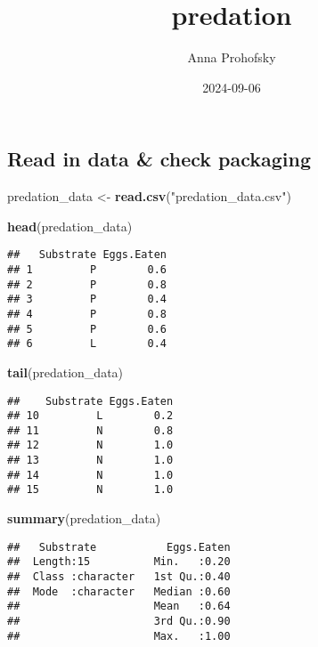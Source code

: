 \documentclass[
]{article}
\title{predation}
\author{Anna Prohofsky}
\date{2024-09-06}
\newenvironment{Shaded}{\begin{snugshade}}{\end{snugshade}}
\newcommand{\FunctionTok}[1]{\textcolor[rgb]{0.13,0.29,0.53}{\textbf{#1}}}
\newcommand{\NormalTok}[1]{#1}
\newcommand{\OtherTok}[1]{\textcolor[rgb]{0.56,0.35,0.01}{#1}}
\newcommand{\StringTok}[1]{\textcolor[rgb]{0.31,0.60,0.02}{#1}}
\begin{document}
\maketitle

\subsection{Read in data \& check
packaging}\label{read-in-data-check-packaging}

\begin{Shaded}
\begin{Highlighting}[]
\NormalTok{predation\_data }\OtherTok{\textless{}{-}} \FunctionTok{read.csv}\NormalTok{(}\StringTok{"predation\_data.csv"}\NormalTok{) }

\FunctionTok{head}\NormalTok{(predation\_data)}
\end{Highlighting}
\end{Shaded}

\begin{verbatim}
##   Substrate Eggs.Eaten
## 1         P        0.6
## 2         P        0.8
## 3         P        0.4
## 4         P        0.8
## 5         P        0.6
## 6         L        0.4
\end{verbatim}

\begin{Shaded}
\begin{Highlighting}[]
\FunctionTok{tail}\NormalTok{(predation\_data)}
\end{Highlighting}
\end{Shaded}

\begin{verbatim}
##    Substrate Eggs.Eaten
## 10         L        0.2
## 11         N        0.8
## 12         N        1.0
## 13         N        1.0
## 14         N        1.0
## 15         N        1.0
\end{verbatim}

\begin{Shaded}
\begin{Highlighting}[]
\FunctionTok{summary}\NormalTok{(predation\_data)}
\end{Highlighting}
\end{Shaded}

\begin{verbatim}
##   Substrate           Eggs.Eaten  
##  Length:15          Min.   :0.20  
##  Class :character   1st Qu.:0.40  
##  Mode  :character   Median :0.60  
##                     Mean   :0.64  
##                     3rd Qu.:0.90  
##                     Max.   :1.00
\end{verbatim}
\end{document}
